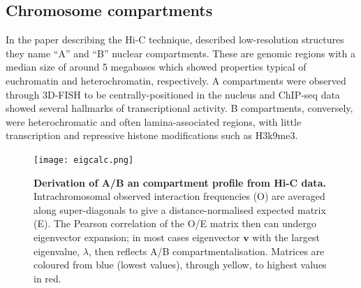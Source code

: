 \documentclass[a4paper,11pt,oneside]{book}
\begin{document}

\subsection{Chromosome compartments}\label{sec:compartments}

In the paper describing the Hi-C technique, \citet{Lieberman2009} described low-resolution structures they name  ``A'' and ``B'' nuclear compartments. These are genomic regions with a median size of around 5 megabases which showed properties typical
of euchromatin and heterochromatin, respectively. A compartments were observed through 3D-FISH to be centrally-positioned in the nucleus and  ChIP-seq data showed several hallmarks of transcriptional activity. B compartments, conversely, were heterochromatic and often lamina-associated regions, with little transcription and repressive histone modifications such as H3k9me3.\cite{Lieberman2009, DeWit2012} 

\begin{figure}
\begin{center}
\texttt{[image: eigcalc.png]}
\captionsetup{width=\textwidth}
\caption[Derivation of an A/B compartment profile from Hi-C data.]{ {\bf Derivation of A/B an compartment profile from Hi-C data.} 
Intrachromosomal observed interaction frequencies (O) are averaged along super-diagonals to give a distance-normalised expected matrix (E). The Pearson correlation of the O/E matrix then can undergo eigenvector expansion; in most cases eigenvector $\mathbf{v}$ with the largest eigenvalue, $\lambda$, then reflects A/B compartmentalisation.\cite{Lieberman2009} Matrices are coloured from blue (lowest values), through yellow, to highest values in red.
}\label{fig:eigcalc}
\end{center}
\end{figure} 
\end{document}
